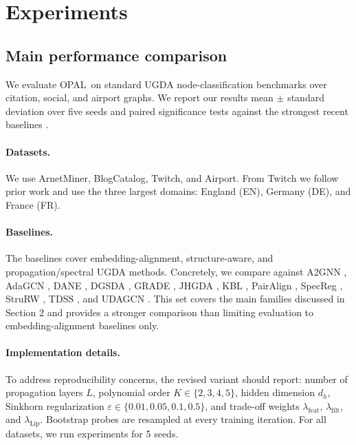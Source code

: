 \documentclass[runningheads]{llncs}
\newcommand{\model}{OPAL}
\begin{document}
\section{Experiments}

\subsection{Main performance comparison}

We evaluate \model\ on standard UGDA node-classification benchmarks over citation, social, and airport graphs. We report our results mean $\pm$ standard deviation over five seeds and paired significance tests against the strongest recent baselines \cite{pygda}.

\paragraph{Datasets.}
We use ArnetMiner, BlogCatalog, Twitch, and Airport. From Twitch we follow prior work and use the three largest domains: England (EN), Germany (DE), and France (FR).

\paragraph{Baselines.}
The baselines cover embedding-alignment, structure-aware, and propagation/spectral UGDA methods. Concretely, we compare against A2GNN \cite{a2gnn}, AdaGCN \cite{adagcn}, DANE \cite{dane}, DGSDA \cite{dgsda}, GRADE \cite{grade}, JHGDA \cite{jhgda}, KBL \cite{kbl}, PairAlign \cite{pair_align}, SpecReg \cite{specreg}, StruRW \cite{stru_rw}, TDSS \cite{tdss}, and UDAGCN \cite{udagcn}. This set covers the main families discussed in Section 2 and provides a stronger comparison than limiting evaluation to embedding-alignment baselines only.

\paragraph{Implementation details.}
To address reproducibility concerns, the revised variant should report: number of propagation layers $L$, polynomial order $K\in\{2,3,4,5\}$, hidden dimension $d_h$, Sinkhorn regularization $\varepsilon\in\{0.01,0.05,0.1,0.5\}$, and trade-off weights $\lambda_{\mathrm{feat}}$, $\lambda_{\mathrm{filt}}$, and $\lambda_{\mathrm{Lip}}$. Bootstrap probes are resampled at every training iteration. For all datasets, we run experiments for 5 seeds.
\end{document}
